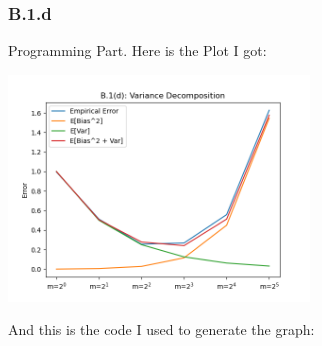 \documentclass[]{article}
\begin{document}
    \subsubsection*{B.1.d}
        Programming Part. Here is the Plot I got: 
        \begin{center}
            \includegraphics[width=8cm]{B.1(d)plot.png}
        \end{center}
        And this is the code I used to generate the graph: 
\end{document}
